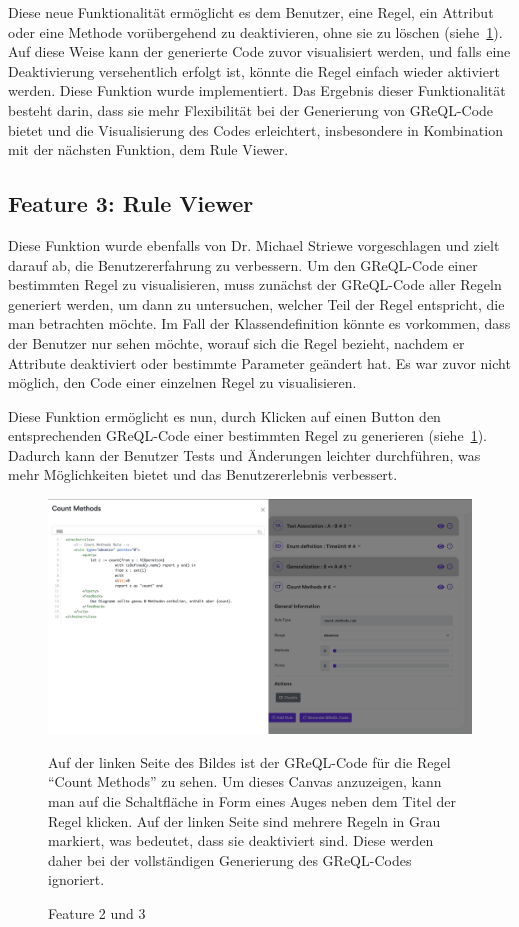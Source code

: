 Diese neue Funktionalität ermöglicht es dem Benutzer, eine Regel, ein Attribut oder eine Methode vorübergehend zu
deaktivieren, ohne sie zu löschen (siehe~\ref{fig:feat2n3}). Auf diese Weise kann der generierte Code zuvor visualisiert werden, und falls eine
Deaktivierung versehentlich erfolgt ist, könnte die Regel einfach wieder aktiviert werden. Diese Funktion wurde
implementiert. Das Ergebnis dieser Funktionalität besteht darin, dass sie mehr Flexibilität bei der Generierung von
GReQL-Code bietet und die Visualisierung des Codes erleichtert, insbesondere in Kombination mit der nächsten Funktion,
dem Rule Viewer.

\subsection{Feature 3: Rule Viewer}
Diese Funktion wurde ebenfalls von Dr. Michael Striewe vorgeschlagen und zielt darauf ab, die Benutzererfahrung zu
verbessern. Um den GReQL-Code einer bestimmten Regel zu visualisieren, muss zunächst der GReQL-Code aller Regeln
generiert werden, um dann zu untersuchen, welcher Teil der Regel entspricht, die man betrachten möchte. Im Fall der
Klassendefinition könnte es vorkommen, dass der Benutzer nur sehen möchte, worauf sich die Regel bezieht, nachdem er
Attribute deaktiviert oder bestimmte Parameter geändert hat. Es war zuvor nicht möglich, den Code einer einzelnen Regel
zu visualisieren.

Diese Funktion ermöglicht es nun, durch Klicken auf einen Button den entsprechenden GReQL-Code einer bestimmten Regel
zu generieren (siehe~\ref{fig:feat2n3}). Dadurch kann der Benutzer Tests und Änderungen leichter durchführen, was mehr Möglichkeiten bietet und
das Benutzererlebnis verbessert.

\begin{figure}[h]
    \centering
    \includegraphics[width=16cm]{images/features-2n3}
    \caption{Feature 2 und 3}
    \medskip
    \small
    Auf der linken Seite des Bildes ist der GReQL-Code für die Regel ``Count Methods'' zu sehen. Um dieses Canvas
    anzuzeigen, kann man auf die Schaltfläche in Form eines Auges neben dem Titel der Regel klicken. Auf der linken
    Seite sind mehrere Regeln in Grau markiert, was bedeutet, dass sie deaktiviert sind. Diese werden daher bei der
    vollständigen Generierung des GReQL-Codes ignoriert.
    \label{fig:feat2n3}
\end{figure}

